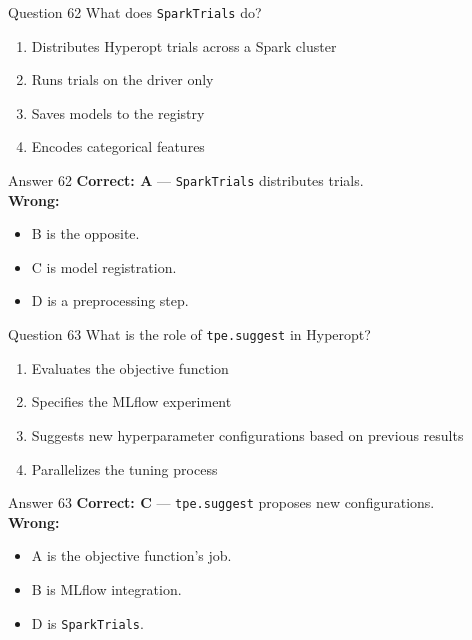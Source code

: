 \documentclass[aspectratio=169,11pt]{beamer}
\begin{document}
	\begin{frame}{Question 62}
		What does \texttt{SparkTrials} do?
		\begin{enumerate}[label=\Alph*.]
			\item Distributes Hyperopt trials across a Spark cluster
			\item Runs trials on the driver only
			\item Saves models to the registry
			\item Encodes categorical features
		\end{enumerate}
	\end{frame}
	\begin{frame}{Answer 62}
		\textbf{Correct: A} --- \texttt{SparkTrials} distributes trials.\\
		\vspace{0.5em}
		\textbf{Wrong:}
		\begin{itemize}
			\item B is the opposite.
			\item C is model registration.
			\item D is a preprocessing step.
		\end{itemize}
	\end{frame}
	
	\begin{frame}{Question 63}
		What is the role of \texttt{tpe.suggest} in Hyperopt?
		\begin{enumerate}[label=\Alph*.]
			\item Evaluates the objective function
			\item Specifies the MLflow experiment
			\item Suggests new hyperparameter configurations based on previous results
			\item Parallelizes the tuning process
		\end{enumerate}
	\end{frame}
	\begin{frame}{Answer 63}
		\textbf{Correct: C} --- \texttt{tpe.suggest} proposes new configurations.\\
		\vspace{0.5em}
		\textbf{Wrong:}
		\begin{itemize}
			\item A is the objective function's job.
			\item B is MLflow integration.
			\item D is \texttt{SparkTrials}.
		\end{itemize}
	\end{frame}
	
\end{document}
